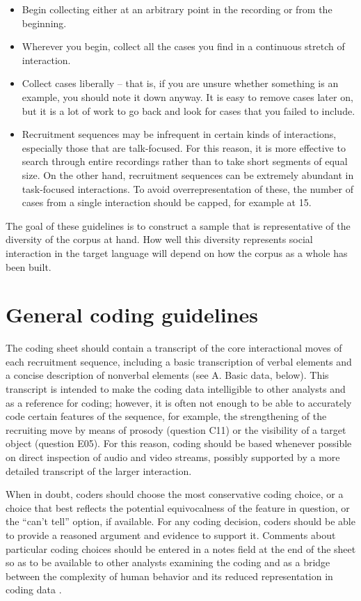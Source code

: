 \documentclass[output=paper]{langsci/langscibook}
\begin{document}
\begin{itemize}
\item Begin collecting either at an arbitrary point in the recording or from the beginning.
\item Wherever you begin, collect all the cases you find in a continuous stretch of interaction.
\item Collect cases liberally -- that is, if you are unsure whether something is an example, you should note it down anyway. It is easy to remove cases later on, but it is a lot of work to go back and look for cases that you failed to include.
\item Recruitment sequences may be infrequent in certain kinds of interactions, especially those that are talk-focused. For this reason, it is more effective to search through entire recordings rather than to take short segments of equal size. On the other hand, recruitment sequences can be extremely abundant in task-focused interactions. To avoid overrepresentation of these, the number of cases from a single interaction should be capped, for example at 15.
\end{itemize}

The goal of these guidelines is to construct a sample that is representative of the diversity of the corpus at hand. How well this diversity represents social interaction in the target language will depend on how the corpus as a whole has been built.


\section{General coding guidelines}\label{sec:coding:5}

The coding sheet should contain a transcript of the core interactional moves of each recruitment sequence, including a basic transcription of verbal elements and a concise description of nonverbal elements (see  A. Basic data, below). This transcript is intended to make the coding data intelligible to other analysts and as a reference for coding; however, it is often not enough to be able to accurately code certain features of the sequence, for example, the strengthening of the recruiting move by means of prosody (question C11) or the visibility of a target object (question E05). For this reason, coding should be based whenever possible on direct inspection of audio and video streams, possibly supported by a more detailed transcript of the larger interaction.

When in doubt, coders should choose the most conservative coding choice, or a choice that best reflects the potential equivocalness of the feature in question, or the “can’t tell” option, if available. For any coding decision, coders should be able to provide a reasoned argument and evidence to support it. Comments about particular coding choices should be entered in a notes field at the end of the sheet so as to be available to other analysts examining the coding and as a bridge between the complexity of human behavior and its reduced representation in coding data \citep{Stivers2015}.
\end{document}
